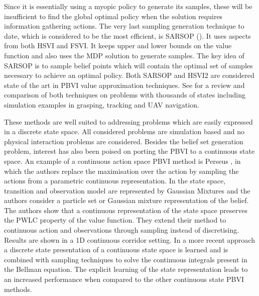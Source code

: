 Since it is essentially using a myopic policy to generate its samples, these will be insufficient to find the global optimal policy when the solution requires information gathering actions. The very last sampling generation technique to date, which is considered to be the most efficient, is SARSOP (\cite{SARSOP}).
It uses aspects from both HSVI and FSVI. It keeps upper and lower bounds on the value function and also uses the MDP solution to generate samples. 
The key idea of SARSOP is to sample belief points which will contain the optimal set of samples necessary to achieve an optimal policy.  
Both SARSOP and HSVI2 are considered state of the art in PBVI value approximation techniques. See \cite{POMDP_approach_2010} for a review and comparison of both techniques on problems 
with thousands of states including simulation examples in grasping, tracking and UAV navigation. 

These methods are well suited to addressing problems which are easily expressed in a discrete state space. All considered problems are simulation based and 
no physical interaction problems are considered. Besides the belief set generation problem, interest has also been poised on porting the PBVI to a continuous state space.
An example of a continuous action space PBVI method is Perseus \cite{Spaan05icra}, in which the authors replace the maximisation over the action by sampling the actions from a 
parametric continuous representation. In \cite{PBVI_C_2006} the state space, transition and observation model are represented by Gaussian Mixtures and the authors consider a particle set or Gaussian mixture representation of the belief. 
The authors show that a continuous representation of the state space preserves the PWLC property of the value function. They extend their method to continuous action and observations 
through sampling instead of discretising. Results are shown in a 1D continuous corridor setting. In a 
more recent approach \cite{solving_continous_pomdps_2013} a discrete state presentation of a continuous state space is learned and is combined with sampling
techniques to solve the continuous integrals present in the Bellman equation. The explicit learning of the state representation leads to an increased performance
when compared to the other continuous state PBVI methods. 

